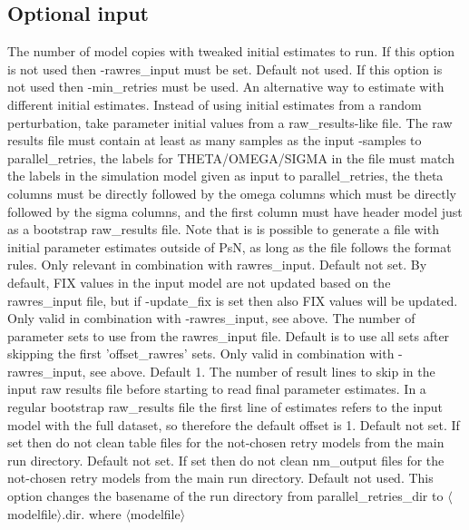 \subsection{Optional input}
\begin{optionlist}
The number of model copies with tweaked initial estimates to run. 
If this option is not used then -rawres\_input must be set.
\nextopt
{}
Default not used. If this option is not used then -min\_retries must be used.
An alternative way to estimate with different initial estimates. 
Instead of using initial estimates from a random perturbation, take parameter initial values from a raw\_results-like file.
The raw results file must contain at least as many samples as the input -samples to parallel\_retries, the labels for  THETA/OMEGA/SIGMA 
in the file must match the labels in the simulation model given as input to parallel\_retries, 
the theta columns must be directly followed by the omega columns which must be directly followed by the sigma columns, and the first column 
must have header model just as a bootstrap raw\_results file. Note that is is possible to generate a file with initial parameter estimates outside of PsN, 
as long as the file follows the format rules.
\nextopt
{}
Only relevant in combination with rawres\_input. Default not set.
By default, FIX values in the input model are not updated based
on the rawres\_input file, but if -update\_fix is set then also
FIX values will be updated.
\nextopt
{}
Only valid in combination with -rawres\_input, see above. The number of
parameter sets to use from the rawres\_input file. 
Default is to use all sets after skipping the first 'offset\_rawres' sets.
\nextopt
{}
Only valid in combination with -rawres\_input, see above. Default 1.
The number of result lines to skip in the input raw results file before starting to read final parameter estimates. In a regular
bootstrap raw\_results file the first line of estimates refers to the input model with the full dataset, so therefore the default offset is 1.
\nextopt
{}
Default not set. If set then do not clean table files for the not-chosen
retry models from the main run directory.
\nextopt
{}
Default not set. If set then do not clean nm\_output files for the not-chosen
retry models from the main run directory.
Default not used. This option changes the basename of the run directory from 
parallel\_retries\_dir to $\langle$modelfile$\rangle$.dir. where $\langle$modelfile$\rangle$ 

\end{optionlist}
